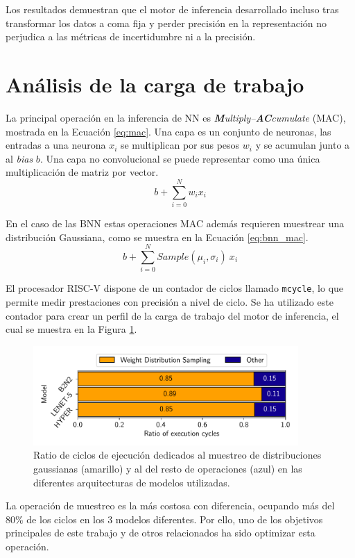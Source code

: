 Los resultados demuestran que el motor de inferencia desarrollado incluso tras transformar los datos a coma fija y perder precisión en la representación no perjudica a las métricas de incertidumbre ni a la precisión.

\section{Análisis de la carga de trabajo}

La principal operación en la inferencia de NN es \textit{\textbf{M}ultiply–\textbf{AC}cumulate} (MAC), mostrada en la Ecuación \ref{eq:mac}. Una capa es un conjunto de neuronas, las entradas a una neurona $x_i$ se multiplican por sus pesos $w_i$ y se acumulan junto a al \textit{bias} $b$. Una capa no convolucional se puede representar como una única multiplicación de matriz por vector.
\begin{equation} \label{eq:mac}
b + \sum_{i=0}^N w_i x_i
\end{equation}

En el caso de las BNN estas operaciones MAC además requieren muestrear una distribución Gaussiana, como se muestra en la Ecuación \ref{eq:bnn_mac}.
\begin{equation} \label{eq:bnn_mac}
b + \sum_{i=0}^N Sample(\mu_i, \sigma_i)\ x_i
\end{equation}

El procesador RISC-V dispone de un contador de ciclos llamado \texttt{mcycle}, lo que permite medir prestaciones con precisión a nivel de ciclo. Se ha utilizado este contador para crear un perfil de la carga de trabajo del motor de inferencia, el cual se muestra en la Figura \ref{fig:cycle_profile}.

\begin{figure}[h]
	\centering
	\includegraphics[width=0.9\textwidth]{root/Imagenes/bnn_lib/cycles.pdf}
	\caption{Ratio de ciclos de ejecución dedicados al muestreo de distribuciones gaussianas (amarillo) y al del resto de operaciones (azul) en las diferentes arquitecturas de modelos utilizadas.}
	\label{fig:cycle_profile}
\end{figure}

La operación de muestreo es la más costosa con diferencia, ocupando más del 80\% de los ciclos en los 3 modelos diferentes. Por ello, uno de los objetivos principales de este trabajo y de otros relacionados ha sido optimizar esta operación.
